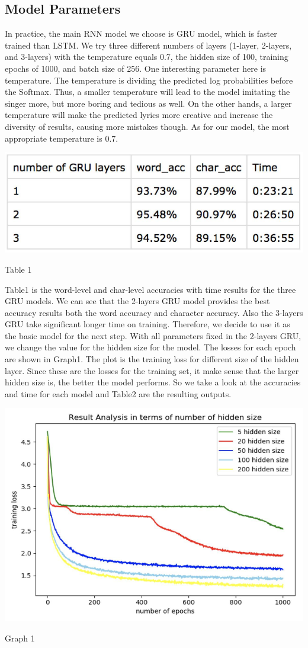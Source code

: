 \documentclass[11pt,a4paper]{article}
\begin{document}
\subsection{Model Parameters}
In practice, the main RNN model we choose is GRU model, which is faster trained than LSTM. We try three different numbers of layers (1-layer, 2-layers, and 3-layers) with the temperature equals 0.7, the hidden size of 100, training epochs of 1000, and batch size of 256. One interesting parameter here is temperature. The temperature is dividing the predicted log probabilities before the Softmax. Thus, a smaller temperature will lead to the model imitating the singer more, but more boring and tedious as well. On the other hands, a larger temperature will make the predicted lyrics more creative and increase the diversity of results, causing more mistakes though. As for our model, the most appropriate temperature is 0.7. 

\includegraphics[scale=0.8]{table1.png}
\centerline{Table 1}

Table1 is the word-level and char-level accuracies with time results for the three GRU models. We can see that the 2-layers GRU model provides the best accuracy results both the word accuracy and character accuracy. Also the 3-layers GRU take significant longer time on training. Therefore, we decide to use it as the basic model for the next step. With all parameters fixed in the 2-layers GRU, we change the value for the hidden size for the model. The losses for each epoch are shown in Graph1. The plot is the training loss for different size of the hidden layer. Since these are the losses for the training set, it make sense that the larger hidden size is, the better the model performs. So we take a look at the accuracies and time for each model and Table2 are the resulting outputs.

\includegraphics[scale=0.8]{graph1.png}
\centerline{Graph 1}
\end{document}
